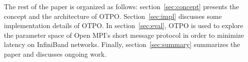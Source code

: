 The rest of the paper is organized as follows: section~\ref{sec:concept}
presents the concept and the architecture of OTPO. 
Section~\ref{sec:impl} discusses some implementation details
of OTPO. In section~\ref{sec:eval}, OTPO is used to explore the
parameter space of Open MPI's short message protocol in order to
minimize latency on InfiniBand networks. Finally,
section~\ref{sec:summary} summarizes 
the paper and discusses ongoing work.

